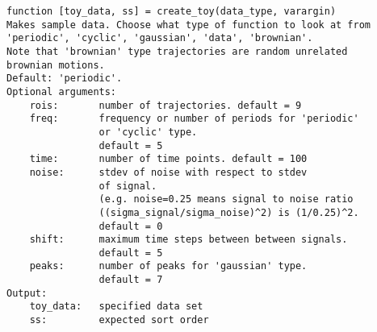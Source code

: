 \begin{lstlisting}[frame=single]
function [toy_data, ss] = create_toy(data_type, varargin)
Makes sample data. Choose what type of function to look at from
'periodic', 'cyclic', 'gaussian', 'data', 'brownian'. 
Note that 'brownian' type trajectories are random unrelated
brownian motions.
Default: 'periodic'. 
Optional arguments:
    rois:       number of trajectories. default = 9
    freq:       frequency or number of periods for 'periodic'
                or 'cyclic' type. 
                default = 5
    time:       number of time points. default = 100
    noise:      stdev of noise with respect to stdev 
                of signal.
                (e.g. noise=0.25 means signal to noise ratio 
                ((sigma_signal/sigma_noise)^2) is (1/0.25)^2.
                default = 0
    shift:      maximum time steps between between signals.
                default = 5
    peaks:      number of peaks for 'gaussian' type. 
                default = 7
Output: 
    toy_data:   specified data set
    ss:         expected sort order
\end{lstlisting}
